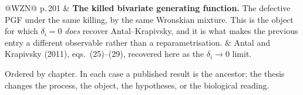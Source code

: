 {\begin{xltabular}{\linewidth}{@{}WZN@{}}
\newline p.\,201 &
\textbf{The killed bivariate generating function.} The defective PGF under the same
killing, by the same Wronskian mixture. This is the object for which $\delta_i=0$
\emph{does} recover Antal--Krapivsky, and it is what makes the previous entry a different
observable rather than a reparametrisation. &
Antal and Krapivsky (2011), eqs.\ (25)--(29), recovered here as the $\delta_i\to0$ limit. \\
\end{xltabular}\par}


{\footnotesize\noindent
Ordered by chapter. In each case a published result is the ancestor; the thesis changes
the process, the object, the hypotheses, or the biological reading.\par}

